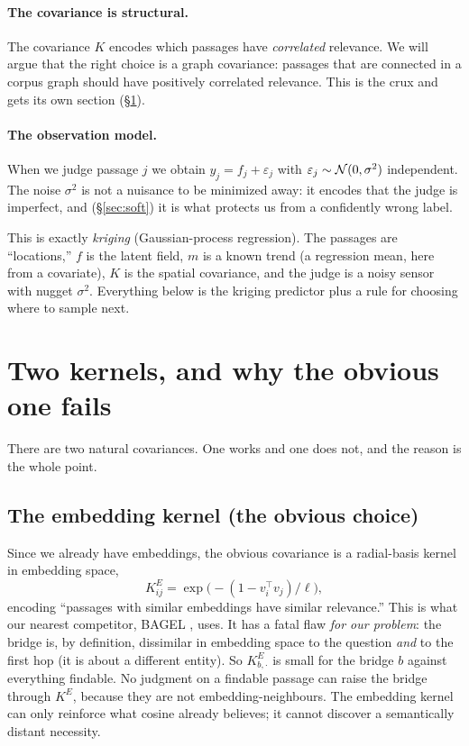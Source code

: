 \documentclass[11pt]{article}
\theoremstyle{plain}
\theoremstyle{definition}
\theoremstyle{remark}
\begin{document}
\paragraph{The covariance is structural.} The covariance $K$ encodes which passages have \emph{correlated}
relevance. We will argue that the right choice is a graph covariance: passages that are connected in a corpus graph
should have positively correlated relevance. This is the crux and gets its own section (\S\ref{sec:kernels}).

\paragraph{The observation model.} When we judge passage $j$ we obtain $y_j = f_j + \varepsilon_j$ with
$\varepsilon_j\sim\mathcal{N}(0,\sigma^2)$ independent. The noise $\sigma^2$ is not a nuisance to be minimized away: it
encodes that the judge is imperfect, and (\S\ref{sec:soft}) it is what protects us from a confidently wrong label.

\begin{stats}
This is exactly \emph{kriging} (Gaussian-process regression). The passages are ``locations,'' $f$ is the latent
field, $m$ is a known trend (a regression mean, here from a covariate), $K$ is the spatial covariance, and the judge
is a noisy sensor with nugget $\sigma^2$. Everything below is the kriging predictor plus a rule for choosing where to
sample next.
\end{stats}

\section{Two kernels, and why the obvious one fails}\label{sec:kernels}
There are two natural covariances. One works and one does not, and the reason is the whole point.

\subsection{The embedding kernel (the obvious choice)}
Since we already have embeddings, the obvious covariance is a radial-basis kernel in embedding space,
\begin{equation}
K^{E}_{ij}=\exp\!\big(-(1-v_i^\top v_j)/\ell\big),
\label{eq:kE}
\end{equation}
encoding ``passages with similar embeddings have similar relevance.'' This is what our nearest competitor, BAGEL
\citep{bagel2026}, uses. It has a fatal flaw \emph{for our problem}: the bridge is, by definition, dissimilar in
embedding space to the question \emph{and} to the first hop (it is about a different entity). So $K^E_{b,\cdot}$ is
small for the bridge $b$ against everything findable. No judgment on a findable passage can raise the bridge through
$K^E$, because they are not embedding-neighbours. The embedding kernel can only reinforce what cosine already
believes; it cannot discover a semantically distant necessity.
\end{document}
